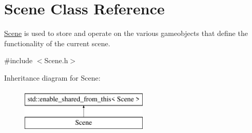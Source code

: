 \hypertarget{class_scene}{}\section{Scene Class Reference}
\label{class_scene}


\hyperlink{class_scene}{Scene} is used to store and operate on the various gameobjects that define the functionality of the current scene.  




{\ttfamily \#include $<$Scene.\+h$>$}

Inheritance diagram for Scene\+:\begin{figure}[H]
\begin{center}
\leavevmode
\includegraphics[height=2.000000cm]{d6/db5/class_scene}
\end{center}
\end{figure}
